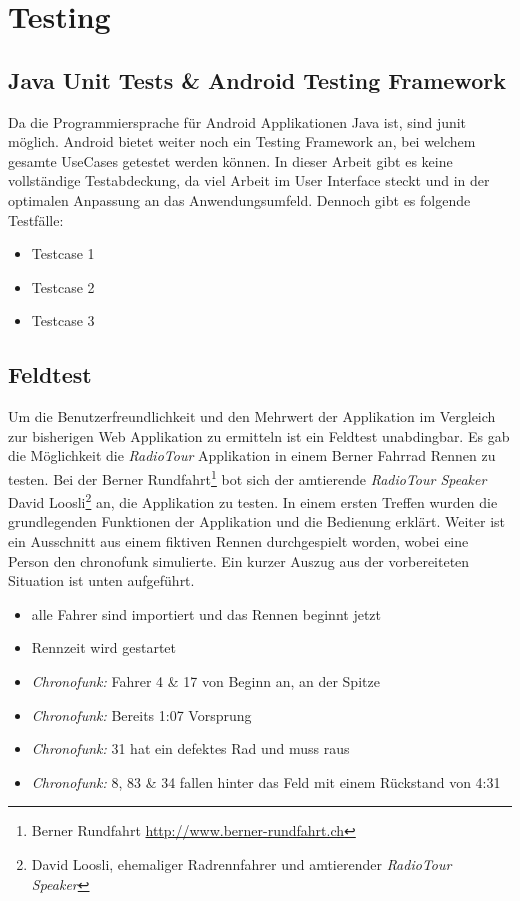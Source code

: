 \chapter{Testing}

\section{Java Unit Tests \& Android Testing Framework}

Da die Programmiersprache für Android Applikationen Java ist, sind \gls{junit} möglich. Android bietet weiter noch ein Testing Framework an, bei welchem gesamte UseCases getestet werden können. In dieser Arbeit gibt es keine vollständige Testabdeckung, da viel Arbeit im User Interface steckt und in der optimalen Anpassung an das Anwendungsumfeld. Dennoch gibt es folgende Testfälle:

\begin{itemize}
\item Testcase 1
\item Testcase 2
\item Testcase 3
\end{itemize}

\section{Feldtest}
Um die Benutzerfreundlichkeit und den Mehrwert der Applikation im Vergleich zur bisherigen Web Applikation zu ermitteln ist ein Feldtest unabdingbar. Es gab die Möglichkeit die \textit{RadioTour} Applikation in einem Berner Fahrrad Rennen zu testen. Bei der Berner Rundfahrt\footnote{Berner Rundfahrt \url{http://www.berner-rundfahrt.ch}} bot sich der amtierende \textit{RadioTour Speaker} David Loosli\footnote{David Loosli, ehemaliger Radrennfahrer und amtierender \textit{RadioTour Speaker}} an, die Applikation zu testen. In einem ersten Treffen wurden die grundlegenden Funktionen der Applikation und die Bedienung erklärt. Weiter ist ein Ausschnitt aus einem fiktiven Rennen durchgespielt worden, wobei eine Person den \gls{chronofunk} simulierte. Ein kurzer Auszug aus der vorbereiteten Situation ist unten aufgeführt.

\begin{itemize}
\item alle Fahrer sind importiert und das Rennen beginnt jetzt
\item Rennzeit wird gestartet
\item \textit{Chronofunk:} Fahrer 4 \& 17 von Beginn an, an der Spitze
\item \textit{Chronofunk:} Bereits 1:07 Vorsprung
\item \textit{Chronofunk:} 31 hat ein defektes Rad und muss raus
\item \textit{Chronofunk:} 8, 83 \& 34 fallen hinter das Feld mit einem Rückstand von 4:31
\end{itemize}

